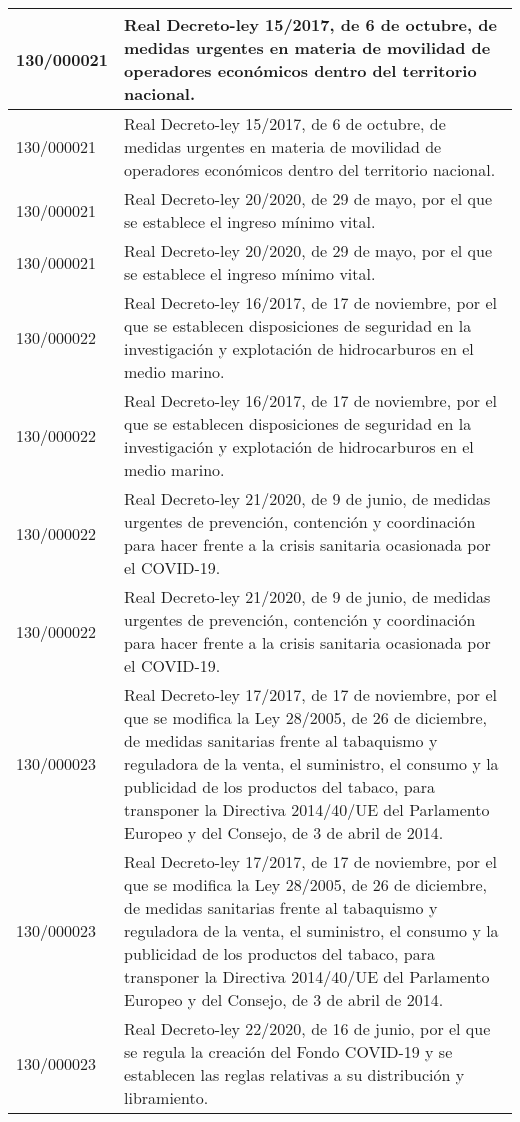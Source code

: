 {\begin{table}[H]
\begin{center}
\begin{tabularx}{\linewidth}{| l | X |}
130/000021 & Real Decreto-ley 15/2017, de 6 de octubre, de medidas urgentes en materia de movilidad de operadores económicos dentro del territorio nacional. \\
\hline
130/000021 & Real Decreto-ley 15/2017, de 6 de octubre, de medidas urgentes en materia de movilidad de operadores económicos dentro del territorio nacional. \\
\hline
130/000021 & Real Decreto-ley 20/2020, de 29 de mayo, por el que se establece el ingreso mínimo vital. \\
\hline
130/000021 & Real Decreto-ley 20/2020, de 29 de mayo, por el que se establece el ingreso mínimo vital. \\
\hline
130/000022 & Real Decreto-ley 16/2017, de 17 de noviembre, por el que se establecen disposiciones de seguridad en la investigación y explotación de hidrocarburos en el medio marino. \\
\hline
130/000022 & Real Decreto-ley 16/2017, de 17 de noviembre, por el que se establecen disposiciones de seguridad en la investigación y explotación de hidrocarburos en el medio marino. \\
\hline
130/000022 & Real Decreto-ley 21/2020, de 9 de junio, de medidas urgentes de prevención, contención y coordinación para hacer frente a la crisis sanitaria ocasionada por el COVID-19. \\
\hline
130/000022 & Real Decreto-ley 21/2020, de 9 de junio, de medidas urgentes de prevención, contención y coordinación para hacer frente a la crisis sanitaria ocasionada por el COVID-19. \\
\hline
130/000023 & Real Decreto-ley 17/2017, de 17 de noviembre, por el que se modifica la Ley 28/2005, de 26 de diciembre, de medidas sanitarias frente al tabaquismo y reguladora de la venta, el suministro, el consumo y la publicidad de los productos del tabaco, para transponer la Directiva 2014/40/UE del Parlamento Europeo y del Consejo, de 3 de abril de 2014. \\
\hline
130/000023 & Real Decreto-ley 17/2017, de 17 de noviembre, por el que se modifica la Ley 28/2005, de 26 de diciembre, de medidas sanitarias frente al tabaquismo y reguladora de la venta, el suministro, el consumo y la publicidad de los productos del tabaco, para transponer la Directiva 2014/40/UE del Parlamento Europeo y del Consejo, de 3 de abril de 2014. \\
\hline
130/000023 & Real Decreto-ley 22/2020, de 16 de junio, por el que se regula la creación del Fondo COVID-19 y se establecen las reglas relativas a su distribución y libramiento. \\

\end{tabularx}
\end{center}
\end{table}}
